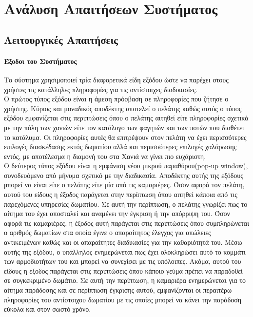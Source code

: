 \chapter{Ανάλυση Απαιτήσεων Συστήματος}

\section{Λειτουργικές Απαιτήσεις}
\subsubsection{Έξοδοι του Συστήματος}
Το σύστημα χρησιμοποιεί τρία διαφορετικά είδη εξόδου ώστε να παρέχει στους χρήστες τις κατάλληλες
πληροφορίες για τις αντίστοιχες διαδικασίες. \\

\noindent 
Ο πρώτος τύπος εξόδου είναι η άμεση πρόσβαση σε πληροφορίες που ζήτησε ο χρήστης. Κύριος και 
μοναδικός αποδέκτης αποτελεί ο πελάτης καθώς αυτός ο τύπος εξόδου εμφανίζεται στις περιπτώσεις 
όπου ο πελάτης αιτηθεί  είτε πληροφορίες σχετικά με την πόλη των χανιών είτε τον  κατάλογο των 
φαγητών και των ποτών που διαθέτει το κατάλυμα. Οι πληροφορίες αυτές θα επιτρέψουν στον πελάτη 
να έχει  περισσότερες επιλογές διασκέδασης εκτός δωματίου αλλά και  περισσότερες επιλογές 
χαλάρωσης εντός, με αποτέλεσμα η διαμονή του στα Χανιά να γίνει πιο ευχάριστη.\\ 

\noindent
Ο δεύτερος τύπος εξόδου είναι η εμφάνιση νέου μικρού παραθύρου(pop-up window), συνοδευόμενο από 
μήνυμα σχετικό με  την διαδικασία. Αποδέκτης αυτής της εξόδους μπορεί να είναι είτε ο πελάτης είτε 
μία από τις καμαριέρες. Όσον αφορά τον πελάτη, αυτού του είδους η έξοδος  παράγεται στην περίπτωση 
όπου αιτηθεί κάποια από τις παρεχόμενες υπηρεσίες δωματίου. Σε αυτή την περίπτωση, ο πελάτης 
γνωρίζει πως το αίτημα του έχει αποσταλεί και αναμένει την έγκριση ή την απόρριψη του. Όσον αφορά 
τις καμαριέρες, η έξοδος αυτή παράγεται στις περιπτώσεις όπου  συμπληρώνεται ο αριθμός δωματίων 
στα οποία έγινε ο απαραίτητος έλεγχος για απώλειες αντικειμένων καθώς και οι απαραίτητες διαδικασίες 
για την καθαριότητά του. Μέσω αυτής της εξόδου, ο υπάλληλος ενημερώνεται πως έχει ολοκληρώσει 
αυτό το κομμάτι των αρμοδιοτήτων του και μπορεί να συνεχίσει με τις υπόλοιπες. Ακόμα, αυτού του 
είδους η έξοδος παράγεται στις περιπτώσεις όπου κάποιο γεύμα πρέπει να παραδοθεί σε συγκεκριμένο 
δωμάτιο. Σε αυτή την περίπτωση, η καμαριέρα ενημερώνεται για το αίτημα παράδοσης και σε περίπτωση 
έγκρισης αυτού, εμφανίζονται οι περαιτέρω πληροφορίες του αντίστοιχου δωματίου με τις οποίες 
μπορεί να κάνει την  παράδοση εύκολα και στον σωστό χρόνο.\\

